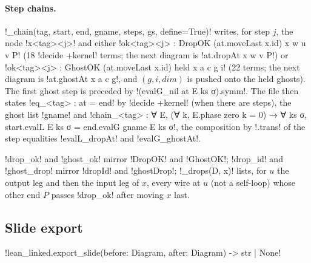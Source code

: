 \paragraph{Step chains.} \py!_chain(tag, start, end, gname, steps, gs, define=True)! writes, for step $j$, the node \lean!x<tag><j>! and either \lean!ok<tag><j> : DropOK (at.moveLast x.id) x w u v P! (18 \lean!decide +kernel! terms; the next diagram is \lean!at.dropAt x w v P!) or \lean!ok<tag><j> : GhostOK (at.moveLast x.id) held x a c g i! (22 terms; the next diagram is \lean!at.ghostAt x a c g!, and $(g,i,\mathit{dim})$ is pushed onto the held ghosts). The first ghost step is preceded by \lean!(evalG_nil at E ks σ).symm!. The file then states \lean!eq_<tag> : at = end! by \lean!decide +kernel! (when there are steps), the ghost list \lean!gname! and
\lean!chain_<tag> : ∀ E, (∀ k, E.phase zero k = 0) → ∀ ks σ, start.evalL E ks σ = end.evalG gname E ks σ!, the composition by \lean!.trans! of the step equalities \lean!evalL_dropAt! and \lean!evalG_ghostAt!.

\py!drop_ok! and \py!ghost_ok! mirror \lean!DropOK! and \lean!GhostOK!; \py!drop_id! and \py!ghost_drop! mirror \lean!dropId! and \lean!ghostDrop!; \py!_drops(D, x)! lists, for $u$ the output leg and then the input leg of $x$, every wire at $u$ (not a self-loop) whose other end $P$ passes \py!drop_ok! after moving $x$ last.

\subsection{Slide export}

\begin{signature}
\py!lean_linked.export_slide(before: Diagram, after: Diagram) -> str | None!
\end{signature}

